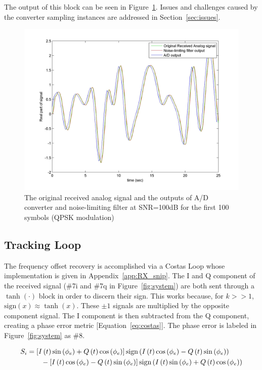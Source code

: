 \documentclass[]{article}
\newcommand{\rom}[1]{\uppercase\expandafter{\romannumeral#1}}
\begin{document}
The output of this block can be seen in Figure~\ref{fig:atod}.  Issues and challenges caused by the converter sampling instances are addressed in Section~\ref{sec:issues}.

\begin{figure}[H]
\centering
\includegraphics[width=\textwidth]	{AtoD.jpg}
\caption{The original received analog signal and the outputs of A/D converter and noise-limiting filter at SNR=100dB for the first 100 symbols (QPSK modulation)\label{fig:atod}}
\end{figure}

\subsection{Tracking Loop}
\label{sec:tracking}
The frequency offset recovery is accomplished via a Costas Loop whose implementation is given in Appendix~\ref{app:RX_snip}. The I and Q component of the received signal (\#7i and \#7q in Figure~\ref{fig:system}) are both sent through a $\tanh\left(\cdot\right)$ block in order to discern their sign.  This works because, for $k>>1$, $\text{sign}\left(x\right) \approx \tanh \left(x\right)$.  These $\pm1$ signals are multiplied by the opposite component signal.  The I component is then subtracted from the Q component, creating a phase error metric [Equation~\ref{eq:costas}].  The phase error is labeled in Figure~\ref{fig:system} as \#8. 

\begin{align}
  \label{eq:costas}
  S_{\rom{1}} &= \left[I\left(t\right)\sin\left(\phi_e\right)+Q\left(t\right)\cos\left(\phi_e\right)\right]\text{sign}\left(I\left(t\right)\cos\left(\phi_e\right)- Q\left(t\right)\sin\left(\phi_e\right)\right)\nonumber \\
  &\qquad {} - \left[I\left(t\right)\cos\left(\phi_e\right)-Q\left(t\right)\sin\left(\phi_e\right)\right]\text{sign}\left(I\left(t\right)\sin\left(\phi_e\right)+Q\left(t\right)\cos\left(\phi_e\right)\right)
  \end{align}
\end{document}

